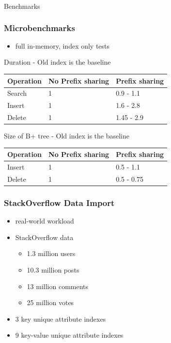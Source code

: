 \documentclass{beamer}
\begin{document}
  \begin{section}{Benchmarks}
    
    \begin{frame}
      \frametitle{Microbenchmarks}
        \begin{itemize}
        \item full in-memory, index only tests
        \end{itemize}
        \pause
        \begin{block}{Duration - Old index is the baseline}
        
        \end{block}
       \begin{tabular}{| l | l | l |}
        \hline
        Operation & No Prefix sharing & Prefix sharing \\ \hline 
        Search & 1 & 0.9 - 1.1  \\ \hline 
        Insert & 1 & 1.6 - 2.8  \\ \hline 
        Delete & 1 & 1.45 - 2.9  \\ \hline 
      \end{tabular}
      
        \begin{block}{
        Size of B+ tree - Old index is the baseline}
        \end{block}
       \begin{tabular}{| l | l | l |}
        \hline
        Operation & No Prefix sharing & Prefix sharing \\ \hline 
        Insert & 1 & 0.5 - 1.1  \\ \hline 
        Delete & 1 & 0.5 - 0.75  \\ \hline 
      \end{tabular}
    \end{frame}

    \begin{frame}
      \frametitle{StackOverflow Data Import}
        \begin{itemize}
        \item real-world workload 
        \item StackOverflow data 
            \begin{itemize}
            \item 1.3 million users
            \item 10.3 million posts
            \item 13 million comments
            \item 25 million votes  
            \end{itemize}  
        \item 3 key unique attribute indexes 
        \item 9 key-value unique attribute indexes
        \end{itemize}
    \end{frame}
    

\end{section}
\end{document}
